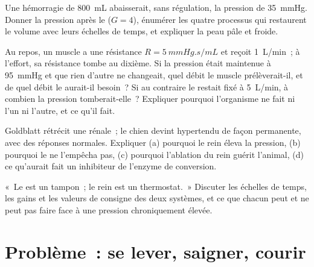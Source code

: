 \begin{exercise}[$\star\star$]\label{exo:b2:blood-pressure:9}
Une hémorragie de \qty{800}{mL} abaisserait, sans régulation, la
pression de \qty{35}{mmHg}. Donner la pression après le 
($G = 4$), énumérer les quatre processus qui restaurent le volume avec
leurs échelles de temps, et expliquer la peau pâle et froide.
\end{exercise}

\begin{exercise}[$\star\star\star$]\label{exo:b2:blood-pressure:10}
Au repos, un muscle a une résistance $R = \qty{5}{mmHg.s/mL}$ et reçoit
\qty{1}{L/min}~; à l'effort, sa résistance tombe au dixième. Si la
pression était maintenue à \qty{95}{mmHg} et que rien d'autre ne
changeait, quel débit le muscle prélèverait-il, et de quel débit le 
aurait-il besoin~? Si au contraire le  restait fixé à
\qty{5}{L/min}, à combien la pression tomberait-elle~? Expliquer pourquoi
l'organisme ne fait ni l'un ni l'autre, et ce qu'il fait.
\end{exercise}

\begin{exercise}[$\star\star\star$]\label{exo:b2:blood-pressure:11}
Goldblatt rétrécit une  rénale~; le chien devint hypertendu de
façon permanente, avec des réponses  normales. Expliquer
(a) pourquoi le rein éleva la pression, (b) pourquoi le  ne
l'empêcha pas, (c) pourquoi l'ablation du rein guérit l'animal, (d) ce
qu'aurait fait un inhibiteur de l'enzyme de conversion.
\end{exercise}

\begin{exercise}[$\star\star\star$]\label{exo:b2:blood-pressure:12}
«~Le  est un tampon~; le rein est un thermostat.~» Discuter
les échelles de temps, les gains et les valeurs de consigne des deux
systèmes, et ce que chacun peut et ne peut pas faire face à une pression
chroniquement élevée.
\end{exercise}

\section{Problème~: se lever, saigner, courir}

